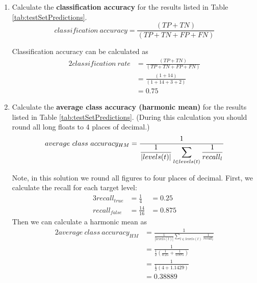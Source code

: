 \documentclass[--SOLUTION-OPTION--]{ditpaper}
\begin{document}
\begin{enumerate}
\begin{enumerate}
\item Calculate the \textbf{classification accuracy} for the results listed in Table \ref{tab:testSetPredictions}.
\begin{equation*}
classification~accuracy = \frac{\left(TP + TN\right)}{\left(TP + TN + FP + FN\right)}
\end{equation*}
\begin{answer}
Classification accuracy can be calculated as
\begin{alignat*}{2}
classification~rate & = \frac{\left(TP + TN\right)}{\left(TP + TN + FP + FN\right)} \\
 & = \frac{\left(1 + 14\right)}{\left(1 + 14 + 3 + 2\right)} \\ 
 & = 0.75
\end{alignat*}
\end{answer}

\item Calculate the \textbf{average class accuracy (harmonic mean)} for the results listed in Table \ref{tab:testSetPredictions}. (During this calculation you should round all long floats to 4 places of decimal.)
\begin{equation*}
average~class~accuracy_{HM} = \displaystyle \frac{1}{\displaystyle \frac{1}{|levels(t)|}\sum_{l \in levels(t)} \frac{1}{recall_l}} \\
\end{equation*}
\begin{answer}
Note, in this solution we round all figures to four places of decimal.
First, we calculate the recall for each target level:
\begin{alignat*}{3}
recall_{\textit{true}} & = \frac{1}{4} & = 0.25 \\
recall_{\textit{false}} & = \frac{14}{16} & = 0.875
\end{alignat*}
Then we can calculate a harmonic mean as
\begin{alignat*}{2}
average~class~accuracy_{HM} & = \displaystyle \frac{1}{\displaystyle \frac{1}{|levels(t)|}\sum_{l \in levels(t)} \frac{1}{recall_l}} \\
& = \displaystyle \frac{1}{\displaystyle \frac{1}{2}\left( \frac{1}{0.25} + \frac{1}{0.875} \right) } \\
& = \displaystyle \frac{1}{\displaystyle \frac{1}{2}\left( 4 + 1.1429 \right) } \\
& = 0.38889
\end{alignat*}
\end{answer}


\end{enumerate}
\end{enumerate}
\end{document}
